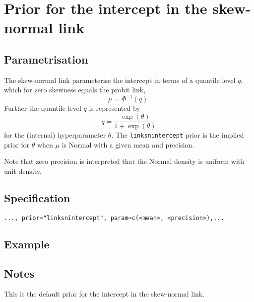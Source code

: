 \documentclass[a4paper,11pt]{article}
\begin{document}
\section*{Prior for the intercept in the skew-normal link}

\subsection*{Parametrisation}
The skew-normal link parameterise the intercept in terms of a quantile
level $q$, which for zero skewness equals the probit link,
\begin{equation}
    \mu = \Phi^{-1}(q).
\end{equation}
Further the quantile level $q$ is represented by
\begin{equation}
    q = \frac{\exp(\theta)}{1+\exp(\theta)}
\end{equation}
for the (internal) hyperparameter $\theta$. The
\texttt{linksnintercept} prior is the implied prior for $\theta$ when
$\mu$ is Normal with a given mean and precision.

Note that zero precision is interpreted that the Normal density is
uniform with unit density.

\subsection*{Specification}
\begin{center}
    \texttt{..., prior="linksnintercept", param=c(<mean>, <precision>),...}
\end{center}

\subsection*{Example}

\subsection*{Notes}

This is the default prior for the intercept in the skew-normal link. 
\end{document}
